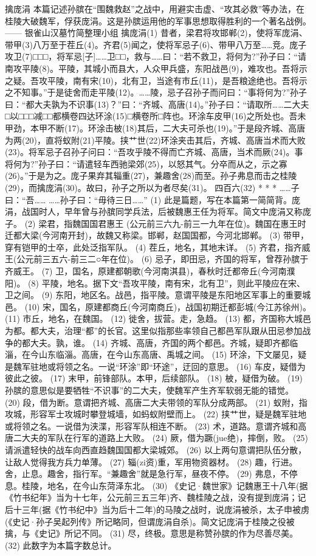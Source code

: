 \documentclass[12pt,UTF8]{ctexbook}
\begin{document}
擒庞涓
本篇记述孙膑在“围魏救赵”之战中，用避实击虚、“攻其必救”等办法，在桂陵大破魏军，俘获庞涓。这是孙膑运用他的军事思想取得胜利的一个著名战例。
—— 银雀山汉墓竹简整理小组
擒庞涓(1)
昔者，梁君将攻邯郸(2)，使将军庞涓、带甲(3)八万至于茬丘(4)。齐君(5)闻之，使将军忌子(6)、带甲八万至……竞。庞子攻卫(7)□□□，将军忌[子]……卫□□，救与……曰：“若不救卫，将何为?”孙子曰：“请南攻平陵(8)。平陵，其城小而县大，人众甲兵盛，东阳战邑(9)，难攻也。吾将示之疑。吾攻平陵，南有宋(10)，北有卫，当途有市丘(11)，是吾粮途绝也。吾将示之不知事。”于是徒舍而走平陵(12)。……陵，忌子召孙子而问曰：“事将何为?”孙子曰：“都大夫孰为不识事(13)？”曰：“齐城、高唐(14)。”孙子曰：“请取所……二大夫□以□□□减□□都横卷四达环涂(15)□横卷所□阵也。环涂{车皮}甲(16)之所处也。吾未甲劲，本甲不断(17)。环涂击柀(18)其后，二大夫可杀也(19)。”于是段齐城、高唐为两(20)，直将蚁附(21)平陵。挟{艹世}(22)环涂夹击其后，齐城、高唐当术而大败(23)。将军忌子召孙子问曰：“吾攻乎陵不得而亡齐城、高唐，当术而厥(24)。事将何为?”孙子曰：“请遣轻车西驰梁郊(25)，以怒其气。分卒而从之，示之寡(26)。”于是为之。庞子果弃其辎重(27)，兼趣舍(28)而至。孙子弗息而击之桂陵(29)，而擒庞涓(30)。故曰，孙子之所以为者尽矣(31)。
四百六(32)
* * *
……子曰：“吾……
……孙子曰：“毋待三日……”
(1) 此是篇题，写在本篇第一简简背。庞涓，战国时人，早年曾与孙膑同学兵法，后被魏惠王任为将军。简文中庞涓又称庞子。
(2) 梁君，指魏国国君惠王 (公元前三六九-前三一九年在位)。魏国在惠王时迁都大梁(今河南开封)，故魏又称梁。邯郸，赵国国都，今河北邯郸。
(3) 带甲，穿有铠甲的士卒，此处泛指军队。
(4) 茬丘，地名，其地末详。
(5) 齐君，指齐威王(公元前三五六-前三二○年在位)。
(6) 忌子，即田忌，齐国的将军，曾荐孙膑于齐威王。
(7) 卫，国名，原建都朝歌(今河南淇县)，春秋时迁都帝丘(今河南濮阳)。
(8) 平陵，地名。据下文“吾攻平陵，南有宋，北有卫”，则此平陵应在宋、卫之间。
(9) 东阳，地区名。战邑，指平陵。意谓平陵是东阳地区军事上的重要城邑。
(10) 宋，国名，原建都商丘(今河南商丘)，战国初期迁都彭城(今江苏徐州)。
(11) 市丘，地名，在魏国。
(12) 徙舍，拔营。走，急趋。
(13) 都，齐国称大城邑为都。都大夫，治理“都”的长官。这里似指那些率领自己都邑军队跟从田忌参加战争的都大夫。孰，谁。
(14) 齐城、高唐，齐国的两个都邑。齐城，疑即齐都临淄，在今山东临淄。高唐，在今山东高唐、禹城之间。
(15) 环涂，下文屡见，疑是魏军驻地或将领之名。一说“环涂”即“环途”，迂回的意思。
(16) {车皮}，疑借为彼此之彼。
(17) 末甲，前锋部队。本甲，后续部队。
(18) 柀，疑借为破。
(19) 孙膑的意思似是要牺牲“不识事”的二大夫，使魏军产生齐军软弱无能的错觉。
(20) 段，借为断。意谓把齐城、高唐二大夫带领的军队分成两部。
(21) 蚁附，指攻城，形容军士攻城时攀登城墙，如蚂蚁附壁而上。
(22) 挟{艹世}，疑是魏军驻地或将领之名。一说借为浃渫，形容军队相连不断。
(23) 术，道路。意谓齐城和高唐二大夫的军队在行军的道路上大败。
(24) 厥，借为蹶(jue绝)，摔倒，败。
(25) 请派遣轻快的战车向西直趋魏国国都大梁城郊。
(26) 以上两句意谓把队伍分散，让敌人觉得我方兵力单薄。
(27) 辎(zi资)重，军用物资器材。
(28) 趣，行进。舍，止息。趣舍，指行军。“兼趣舍”就是急行军，昼夜不停。
(29) 弗息，不停息。桂陵，地名，在今山东菏泽东北。
(30) 《史记·魏世家》记魏惠王十八年(据《竹书纪年》当为十七年，公元前三五三年)齐、魏桂陵之战，没有提到庞涓；记后十三年(据《竹书纪中》当为后十二年)的马陵之战时，说庞涓被杀，太子申被虏(《史记·孙子吴起列传》所记略同，但谓庞涓自杀)。简文记庞涓于桂陵之役被擒，与《史记》所记不同。
(31) 尽，终极。意思是称赞孙膑的作为尽善尽美。
(32) 此数字为本篇字数总计。
\end{document}
